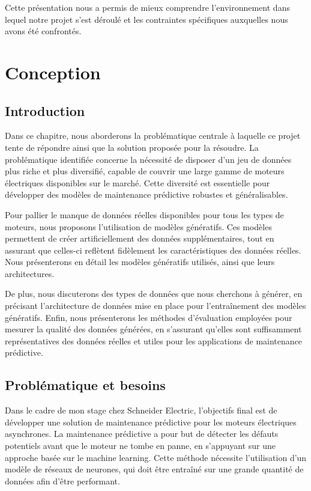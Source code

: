 Cette présentation nous a permis de mieux comprendre l’environnement dans
lequel notre projet s’est déroulé et les contraintes spécifiques auxquelles
nous avons été confrontés.


\chapter{Conception}


\section{Introduction}

Dans ce chapitre, nous aborderons la problématique centrale à laquelle ce
projet tente de répondre ainsi que la solution proposée pour la résoudre. La
problématique identifiée concerne la nécessité de disposer d'un jeu de données
plus riche et plus diversifié, capable de couvrir une large gamme de moteurs
électriques disponibles sur le marché. Cette diversité est essentielle pour
développer des modèles de maintenance prédictive robustes et généralisables.

Pour pallier le manque de données réelles disponibles pour tous les types de
moteurs, nous proposons l'utilisation de modèles génératifs. Ces modèles
permettent de créer artificiellement des données supplémentaires, tout en
assurant que celles-ci reflètent fidèlement les caractéristiques des données
réelles. Nous présenterons en détail les modèles génératifs utilisés, ainsi que
leurs architectures.

De plus, nous discuterons des types de données que nous cherchons à générer, en
précisant l'architecture de données mise en place pour l'entraînement des
modèles génératifs. Enfin, nous présenterons les méthodes d'évaluation
employées pour mesurer la qualité des données générées, en s'assurant qu'elles
sont suffisamment représentatives des données réelles et utiles pour les
applications de maintenance prédictive.

\section{Problématique et besoins}

Dans le cadre de mon stage chez Schneider Electric, l'objectifs final est de
développer une solution de maintenance prédictive pour les moteurs électriques
asynchrones. La maintenance prédictive a pour but de détecter les défauts
potentiels avant que le moteur ne tombe en panne, en s'appuyant sur une
approche basée sur le machine learning. Cette méthode nécessite l'utilisation
d'un modèle de réseaux de neurones, qui doit être entraîné sur une grande
quantité de données afin d'être performant.

